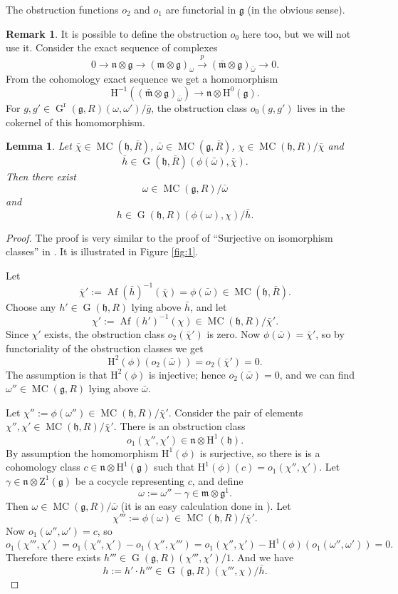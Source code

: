 \documentclass[a4paper,10pt]{amsart}
\newtheorem{lem}[equation]{Lemma}
\theoremstyle{definition}
\newtheorem{rem}[equation]{Remark}
\numberwithin{equation}{section}
\newcommand{\xar}{\xrightarrow}
\newcommand{\opn}{\operatorname}
\newcommand{\mfrak}[1]{\mathfrak{#1}}
\newcommand{\mrm}[1]{\mathrm{#1}}
\newcommand{\g}{\mfrak{g}}
\newcommand{\m}{\mfrak{m}}
\newcommand{\h}{\mfrak{h}}
\newcommand{\n}{\mfrak{n}}
\newcommand{\om}{\omega}
\newcommand{\lb}{\linebreak}
\begin{document}
The obstruction functions $o_2$ and $o_1$ are functorial in $\g$ (in the
obvious sense).

\begin{rem}
It is possible to define the obstruction $o_0$ here too, but we will not use it.
Consider the exact sequence of complexes 
\[ 0 \to \n \otimes \g \to (\m \otimes \g)_{\om} \xar{ \ p \ }
(\bar{\m} \otimes \g)_{\bar{\om}} \to 0 . \]
{}From the cohomology  exact sequence we get a homomorphism
\[ \mrm{H}^{-1} ((\bar{\m} \otimes \g)_{\bar{\om}}) \to
\n \otimes \mrm{H}^{0}(\g) . \]
For 
$g, g' \in \opn{G}^{\mrm{r}}(\g, R)(\om, \om') / \bar{g}$,
the obstruction class $o_0(g, g')$ lives in the cokernel of this homomorphism.
\end{rem}

\begin{lem} \label{lem:1}
Let 
$\bar{\chi} \in \opn{MC}(\h, \bar{R})$,
$\bar{\om} \in \opn{MC}(\g, \bar{R})$,
$\chi \in \opn{MC}(\h, R) / \bar{\chi}$ 
and
\[ \bar{h} \in \opn{G}(\h, \bar{R})(\phi(\bar{\om}), \bar{\chi} ) . \]
Then there exist 
\[ \om \in \opn{MC}(\g, R) / \bar{\om} \]
and 
\[ h \in \opn{G}(\h, R)(\phi(\om), \chi) / \bar{h} . \]
\end{lem}

\begin{proof}
The proof is very similar to the proof of ``Surjective on isomorphism \lb
classes'' in \cite[Subsection 2.11]{GM}. It is illustrated in Figure
\ref{fig:1}.

Let 
\[ \bar{\chi}' := \opn{Af}(\bar{h})^{-1}(\bar{\chi}) 
=\phi(\bar{\om}) \in \opn{MC}(\h, \bar{R}) . \]
Choose any $h' \in \opn{G}(\h, R)$ lying above 
$\bar{h}$, and let 
\[ \chi' := \opn{Af}(h')^{-1}(\chi) \in \opn{MC}(\h, R) / \bar{\chi}' . \]
Since $\chi'$ exists, the obstruction class 
$o_2(\bar{\chi}')$ is zero. Now 
$\phi(\bar{\om}) = \bar{\chi}'$, so by functoriality of the obstruction classes
we get 
\[ \mrm{H}^2 (\phi)(o_2(\bar{\om})) = o_2(\bar{\chi}') = 0 . \]
The assumption is that $\mrm{H}^2 (\phi)$ is injective; 
hence $o_2(\bar{\om}) = 0$, and we can find 
$\om'' \in \opn{MC}(\g, R)$ lying above $\bar{\om}$. 

Let $\chi'' := \phi(\om'') \in \opn{MC}(\h, R) / \bar{\chi}'$. 
Consider the pair of elements 
$\chi'', \chi' \in \opn{MC}(\h, R) / \bar{\chi}'$.
There is an obstruction class 
\[ o_1(\chi'', \chi') \in \n \otimes \mrm{H}^1 (\h) . \]
By assumption the homomorphism $\mrm{H}^1 (\phi)$ is surjective, so there is 
is a cohomology class 
$c \in \n \otimes \mrm{H}^1 (\g)$
such that 
$\mrm{H}^1 (\phi)(c) = o_1(\chi'', \chi')$. 
Let 
$\gamma \in \n \otimes \mrm{Z}^1 (\g)$
be a cocycle representing $c$, and define
\[ \om := \om'' - \gamma \in \m \otimes \g^1 . \]
Then 
$\om \in \opn{MC}(\g, R) / \bar{\om}$
(it is an easy calculation done in \cite{GM}).
Let 
\[ \chi''' := \phi(\om) \in \opn{MC}(\h, R) / \bar{\chi}' . \]
Now $o_1(\om'', \om') = c$, so
\[ o_1(\chi''', \chi') = o_1(\chi'', \chi') - o_1(\chi'', \chi''') = 
o_1(\chi'', \chi') - \mrm{H}^1 (\phi)(o_1(\om'', \om')) = 0 . \]
Therefore there exists 
$h''' \in \opn{G}(\g, R)(\chi''', \chi') / 1$. 
And we have
\[ h := h' \cdot h''' \in \opn{G}(\g, R)(\chi''', \chi) / \bar{h} . \]
\end{proof}
\end{document}
